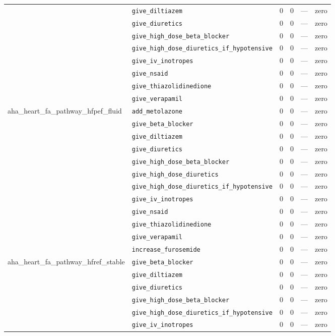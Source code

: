 \begin{table}[ht]
\begin{tabular}{llrrrl}
 & \texttt{give\_diltiazem} & 0 & 0 & — & zero \\
 & \texttt{give\_diuretics} & 0 & 0 & — & zero \\
 & \texttt{give\_high\_dose\_beta\_blocker} & 0 & 0 & — & zero \\
 & \texttt{give\_high\_dose\_diuretics\_if\_hypotensive} & 0 & 0 & — & zero \\
 & \texttt{give\_iv\_inotropes} & 0 & 0 & — & zero \\
 & \texttt{give\_nsaid} & 0 & 0 & — & zero \\
 & \texttt{give\_thiazolidinedione} & 0 & 0 & — & zero \\
 & \texttt{give\_verapamil} & 0 & 0 & — & zero \\
\midrule
aha\_heart\_fa\_pathway\_hfpef\_fluid & \texttt{add\_metolazone} & 0 & 0 & — & zero \\
 & \texttt{give\_beta\_blocker} & 0 & 0 & — & zero \\
 & \texttt{give\_diltiazem} & 0 & 0 & — & zero \\
 & \texttt{give\_diuretics} & 0 & 0 & — & zero \\
 & \texttt{give\_high\_dose\_beta\_blocker} & 0 & 0 & — & zero \\
 & \texttt{give\_high\_dose\_diuretics} & 0 & 0 & — & zero \\
 & \texttt{give\_high\_dose\_diuretics\_if\_hypotensive} & 0 & 0 & — & zero \\
 & \texttt{give\_iv\_inotropes} & 0 & 0 & — & zero \\
 & \texttt{give\_nsaid} & 0 & 0 & — & zero \\
 & \texttt{give\_thiazolidinedione} & 0 & 0 & — & zero \\
 & \texttt{give\_verapamil} & 0 & 0 & — & zero \\
 & \texttt{increase\_furosemide} & 0 & 0 & — & zero \\
\midrule
aha\_heart\_fa\_pathway\_hfref\_stable & \texttt{give\_beta\_blocker} & 0 & 0 & — & zero \\
 & \texttt{give\_diltiazem} & 0 & 0 & — & zero \\
 & \texttt{give\_diuretics} & 0 & 0 & — & zero \\
 & \texttt{give\_high\_dose\_beta\_blocker} & 0 & 0 & — & zero \\
 & \texttt{give\_high\_dose\_diuretics\_if\_hypotensive} & 0 & 0 & — & zero \\
 & \texttt{give\_iv\_inotropes} & 0 & 0 & — & zero \\

\end{tabular}
\end{table}
